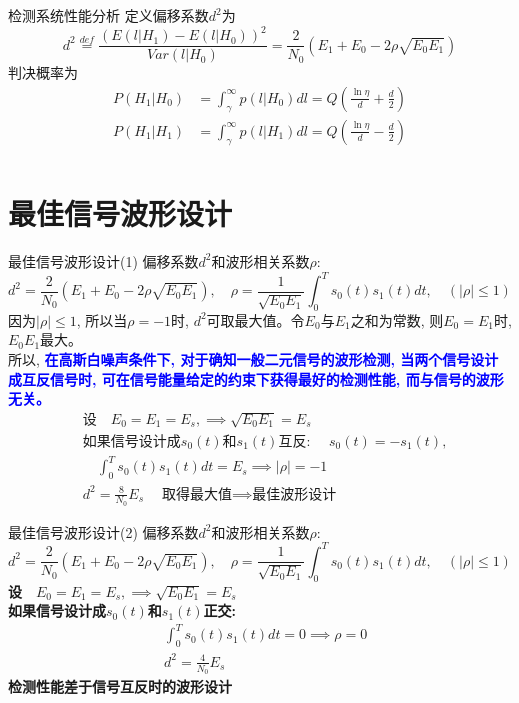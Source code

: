 \begin{frame}{检测系统性能分析}
定义偏移系数$d^2$为
\[d^2\mathop{=}\limits^{def}\frac{(E(l|H_1)-E(l|H_0))^2}{Var(l|H_0)}=\frac{2}{N_0}(E_1+E_0-2\rho\sqrt{E_0E_1}) \]
判决概率为
\begin{align*}
P(H_1|H_0)&=\int_{\gamma}^{\infty}p(l|H_0)dl=Q\left(\frac{\ln\eta}{d}+\frac{d}{2}\right)\\
P(H_1|H_1)&=\int_{\gamma}^{\infty}p(l|H_1)dl=Q\left(\frac{\ln\eta}{d}-\frac{d}{2}\right)\\
\end{align*}
\end{frame}

\section{最佳信号波形设计}

\begin{frame}[shrink]{最佳信号波形设计(1)}
偏移系数$d^2$和波形相关系数$\rho$:
\[d^2=\frac{2}{N_0}(E_1+E_0-2\rho\sqrt{E_0E_1}),\quad \rho=\frac{1}{\sqrt{E_{0}E_{1}}}\int_{0}^{T}s_0(t)s_1(t)dt,\quad(|\rho|\le 1) \]
因为$|\rho|\le 1$, 所以当$\rho=-1$时, $d^2$可取最大值。令$E_0$与$E_1$之和为常数, 则$E_0=E_1$时, $E_0E_1$最大。\\
所以, \textbf{\textcolor{blue}{在高斯白噪声条件下, 对于确知一般二元信号的波形检测, 当两个信号设计成互反信号时, 可在信号能量给定的约束下获得最好的检测性能, 而与信号的波形无关。}}
\begin{align*}
&\textbf{设}\quad E_0=E_1=E_s,\implies\sqrt{E_0E_1}=E_s\\
&\textbf{如果信号设计成$s_0(t)$和$s_1(t)$互反: }\quad s_0(t)=-s_1(t),\\
&\quad\int_{0}^{T}s_0(t)s_1(t)dt=E_s\implies |\rho|=-1\\
&d^2=\frac{8}{N_0}E_s\quad\textbf{取得最大值$\implies$最佳波形设计}
\end{align*}
\end{frame}

\begin{frame}{最佳信号波形设计(2)}
偏移系数$d^2$和波形相关系数$\rho$:
\[d^2=\frac{2}{N_0}(E_1+E_0-2\rho\sqrt{E_0E_1}),\quad \rho=\frac{1}{\sqrt{E_{0}E_{1}}}\int_{0}^{T}s_0(t)s_1(t)dt,\quad(|\rho|\le 1) \]
\textbf{设}$\quad E_0=E_1=E_s,\implies\sqrt{E_0E_1}=E_s$\\
\textbf{如果信号设计成$s_0(t)$和$s_1(t)$正交:}
 \begin{align*}
 &\int_{0}^{T}s_0(t)s_1(t)dt=0 \implies \rho=0 \\
 &d^2=\frac{4}{N_0}E_s
 \end{align*}
\textbf{检测性能差于信号互反时的波形设计}
\end{frame}

